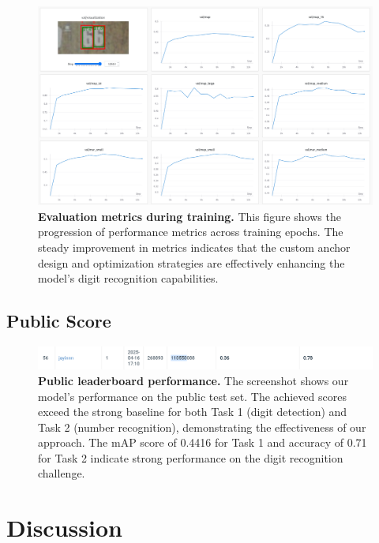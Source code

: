 \documentclass[twocolumn,a4paper]{article}
\begin{document}
\begin{figure}[H]
\centering
\includegraphics[width=0.95\linewidth]{figs/screenshot002}
\caption{\textbf{Evaluation metrics during training.} This figure shows the progression of performance metrics across training epochs. The steady improvement in metrics indicates that the custom anchor design and optimization strategies are effectively enhancing the model's digit recognition capabilities.}
\label{fig:screenshot002}
\end{figure}




\subsection{Public Score}

\begin{figure}[H]
\centering
\includegraphics[width=0.95\linewidth]{figs/screenshot003}
\caption{\textbf{Public leaderboard performance.} The screenshot shows our model's performance on the public test set. The achieved scores exceed the strong baseline for both Task 1 (digit detection) and Task 2 (number recognition), demonstrating the effectiveness of our approach. The mAP score of 0.4416 for Task 1 and accuracy of 0.71 for Task 2 indicate strong performance on the digit recognition challenge.}
\label{fig:screenshot003}
\end{figure}



\section{Discussion}
\end{document}
